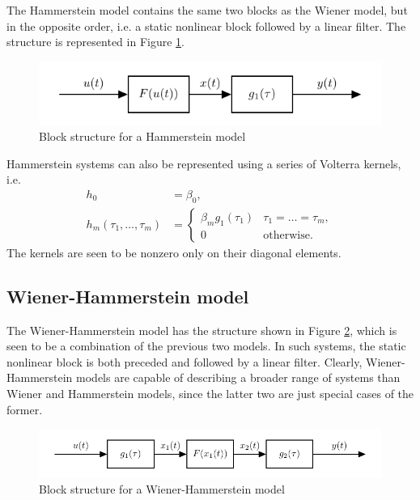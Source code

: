 The Hammerstein model contains the same two blocks as the Wiener model, but in the opposite order, i.e. a static nonlinear block followed by a linear filter. The structure is represented in Figure \ref{fig:HammersteinBS}.

\begin{figure}[!h]
\centering
\includegraphics[scale=1]{Chapter3_VolterraSeries/HammersteinSystem.pdf}
\caption{Block structure for a Hammerstein model}
\label{fig:HammersteinBS}
\end{figure}

Hammerstein systems can also be represented using a series of Volterra kernels, i.e.
\begin{align}
h_0 &= \beta_0, \nonumber \\
h_m(\tau_1,\hdots,\tau_m) &= \begin{cases} \beta_m g_1(\tau_1) & \tau_1 = \hdots = \tau_m, \\ 0 & \textrm{otherwise}. \end{cases}
\end{align}
The kernels are seen to be nonzero only on their diagonal elements.

\subsection{Wiener-Hammerstein model}

The Wiener-Hammerstein model has the structure shown in Figure \ref{fig:WienerHammBS}, which is seen to be a combination of the previous two models. In such systems, the static nonlinear block is both preceded and followed by a linear filter. Clearly, Wiener-Hammerstein models are capable of describing a broader range of systems than Wiener and Hammerstein models, since the latter two are just special cases of the former.

\begin{figure}[!h]
\centering
\includegraphics[scale=1]{Chapter3_VolterraSeries/WienerHammSystem.pdf}
\caption{Block structure for a Wiener-Hammerstein model}
\label{fig:WienerHammBS}
\end{figure}

